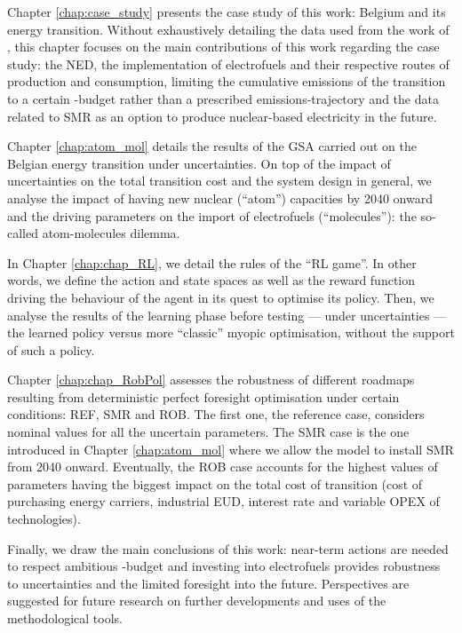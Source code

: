 Chapter \ref{chap:case_study} presents the case study of this work: Belgium and its energy transition. Without exhaustively detailing the data used from the work of \citet{limpens2021generating}, this chapter focuses on the main contributions of this work regarding the case study: the \gls{NED}, the implementation of electrofuels and their respective routes of production and consumption, limiting  the cumulative emissions of the transition to a certain -budget rather than a prescribed emissions-trajectory and the data related to \gls{SMR} as an option to produce nuclear-based electricity in the future.

Chapter \ref{chap:atom_mol} details the results of the \gls{GSA} carried out on the Belgian energy transition under uncertainties. On top of the impact of uncertainties on the total transition cost and the system design in general, we analyse the impact of having new nuclear (``atom'') capacities by 2040 onward and the driving parameters on the import of electrofuels (``molecules''): the so-called atom-molecules dilemma.

In Chapter \ref{chap:chap_RL}, we detail the rules of the ``\gls{RL} game''. In other words, we define the action and state spaces as well as the reward function driving the behaviour of the agent in its quest to optimise its policy. Then, we analyse the results of the learning phase before testing --- under uncertainties --- the learned policy versus more ``classic'' myopic optimisation, \ie without the support of such a policy.

Chapter \ref{chap:chap_RobPol} assesses the robustness of different roadmaps resulting from deterministic perfect foresight optimisation under certain conditions: REF, SMR and ROB. The first one, the reference case, considers nominal values for all the uncertain parameters. The SMR case is the one introduced in Chapter \ref{chap:atom_mol} where we allow the model to install \gls{SMR} from 2040 onward. Eventually, the ROB case accounts for the highest values of parameters having the biggest impact on the total cost of transition (\ie cost of purchasing energy carriers, industrial \gls{EUD}, interest rate and variable \gls{OPEX} of technologies).

Finally, we draw the main conclusions of this work: near-term actions are needed to respect ambitious -budget and investing into electrofuels provides robustness to uncertainties and the limited foresight into the future.  Perspectives are suggested for future research on further developments and uses of the methodological tools.